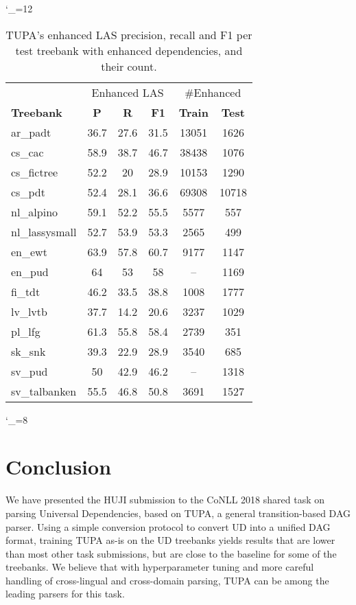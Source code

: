 \documentclass[11pt,a4paper]{article}
\begin{document}
\catcode`\_=12
\begin{table}
\begin{tabular}{l|ccc|cc}
\hline
& \multicolumn{3}{c|}{Enhanced LAS} & \multicolumn{2}{c}{\#Enhanced} \\
\bf Treebank & \bf P & \bf R & \bf F1 & \bf Train & \bf Test \\
\hline
\small ar_padt       & 36.7&27.6&31.5 & 13051 & 1626\\
\small cs_cac        & 58.9&38.7&46.7 & 38438 & 1076\\
\small cs_fictree    & 52.2&20&28.9 & 10153 & 1290\\
\small cs_pdt        & 52.4&28.1&36.6 & 69308 & 10718\\
\small nl_alpino     & 59.1&52.2&55.5 & 5577 & 557\\
\small nl_lassysmall & 52.7&53.9&53.3 & 2565 & 499\\
\small en_ewt        & 63.9&57.8&60.7 & 9177 & 1147\\
\small en_pud        & 64&53&58 & -- & 1169\\
\small fi_tdt        & 46.2&33.5&38.8 & 1008 & 1777\\
\small lv_lvtb       & 37.7&14.2&20.6 & 3237 & 1029\\
\small pl_lfg        & 61.3&55.8&58.4 & 2739 & 351\\
\small sk_snk        & 39.3&22.9&28.9 & 3540 & 685\\
\small sv_pud        & 50&42.9&46.2 & -- & 1318\\
\small sv_talbanken  & 55.5&46.8&50.8 & 3691 & 1527\\
\end{tabular}
\caption{TUPA's enhanced LAS precision, recall and F1 per test treebank with enhanced dependencies,
and their count.
\label{tab:enhanced}}
\end{table}
\catcode`\_=8


\section{Conclusion}\label{sec:conclusion}

We have presented the HUJI submission to the CoNLL 2018 shared task on parsing Universal Dependencies, based on TUPA, a general transition-based DAG parser.
Using a simple conversion protocol to convert UD into a unified DAG format,
training TUPA as-is on the UD treebanks yields results that are lower than
most other task submissions, but are close to the baseline for some of the treebanks.
We believe that with hyperparameter tuning and more careful handling of
cross-lingual and cross-domain parsing, TUPA can be among the leading parsers for this task.
\end{document}
